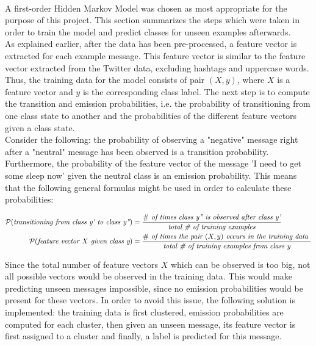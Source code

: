 
 \\

A first-order Hidden Markov Model was chosen as most appropriate for the purpose of this project. This section summarizes the steps which were taken in order to train the model and predict classes for unseen examples afterwards. \\

\noindent As explained earlier, after the data has been pre-processed, a feature vector is extracted for each example message. This feature vector is similar to the feature vector extracted from the Twitter data, excluding hashtags and uppercase words. Thus, the training data for the model consists of pair $(X, y)$, where $X$ is a feature vector and $y$ is the corresponding class label. The next step is to compute the transition and emission probabilities, i.e. the probability of transitioning from one class state to another and the probabilities of the different feature vectors given a class state. \\

\noindent  Consider the following: the probability of observing a "negative" message right after a "neutral" message has been observed is a transition probability. Furthermore, the probability of the feature vector of the message 'I need to get some sleep now' given the neutral class is an emission probability. This means that the following general formulas might be used in order to calculate these probabilities:

\begin{align*}
\cal{P} (\textit{transitioning from class y' to class y''}) 
&= \frac {\# \textit{ of times class y'' is observed after class y'}} {\textit {total \# of training examples}} \\
\cal{P} (\textit{feature vector $X$ given class y}) 
&= \frac {\# \textit{ of times the pair $(X, y)$ occurs in the training data }} {\textit {total \# of training examples from class y}} \\
\end{align*}

\noindent Since the total number of feature vectors $X$ which can be observed is too big, not all possible vectors would be observed in the training data. This would make predicting unseen messages impossible, since no emission probabilities would be present for these vectors. In order to avoid this issue, the following solution is implemented: the training data is first clustered, emission probabilities are computed for each cluster, then given an unseen message, its feature vector is first assigned to a cluster and finally, a label is predicted for this message. 
